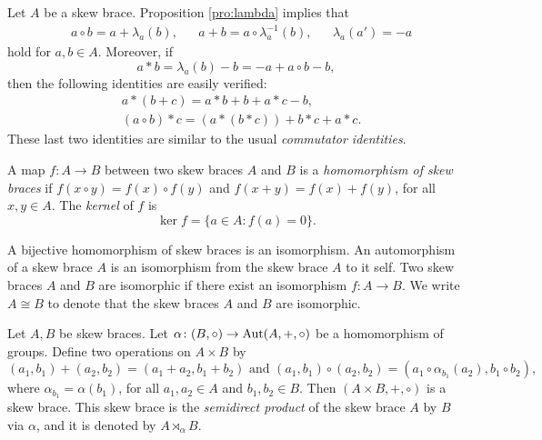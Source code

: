 Let $A$ be a skew brace. 
Proposition \ref{pro:lambda} implies that 
\begin{align}
\label{eq:formulas}
&a\circ b = a+\lambda_a(b),
&&a+b=a\circ \lambda^{-1}_a(b),
&&\lambda_a(a')=-a
\end{align}
hold for $a,b\in A$. Moreover, if 
\[
    a*b=\lambda_a(b)-b=-a+a\circ b-b,
\]
then the following identities are easily verified:
\begin{align}
&a*(b+c)=a*b+b+a*c-b,\\
&(a\circ b)*c=(a*(b*c))+b*c+a*c.
\end{align}
These last two identities are similar to the usual
\emph{commutator identities}.

 \begin{definition}
 	A map $f\colon A\to B$ between two skew braces $A$ and $B$ is a {\em homomorphism of skew braces} if $f(x\circ y)=f(x)\circ f(y)$ and $f(x+y)=f(x)+f(y)$, for all $x,y\in A$.  The \emph{kernel} of $f$ is
     \[
         \ker f=\{a\in A:f(a)=0\}.
     \]
 \end{definition}

A bijective homomorphism of skew braces is an isomorphism. An automorphism of a skew brace $A$ is an isomorphism from the skew brace $A$ to it self. Two skew braces $A$ and $B$ are isomorphic if there exist an isomorphism $f\colon A\rightarrow B$. We write $A\cong B$ to denote that the skew braces $A$ and $B$ are isomorphic.

\begin{proposition}
\label{prop:semidirect} 
 Let $A,B$ be skew braces. Let $\alpha\colon (B,\circ)\rightarrow \operatorname{Aut}(A,+,\circ)$ be a homomorphism of groups. Define two operations on $A\times B$ by
\[ (a_1,b_1)+(a_2,b_2)=(a_1+a_2,b_1+b_2)\text{ and }(a_1,b_1)\circ (a_2,b_2)=(a_1\circ\alpha_{b_1}(a_2),b_1\circ b_2),\]
where $\alpha_{b_1}=\alpha(b_1)$, for all $a_1,a_2\in A$ and $b_1,b_2\in B$. Then $(A\times B,+,\circ)$ is a skew brace. This skew brace is the {\em semidirect product} of the skew brace $A$ by $B$ via $\alpha$, and it is denoted by $A\rtimes_{\alpha}B$.
\end{proposition}

